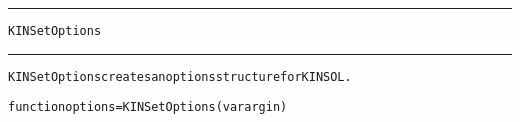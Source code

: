 \begin{samepage}
\hrule
\begin{center}
{\large \verb!KINSetOptions!}
\label{p:KINSetOptions}
\end{center}
\hrule\vspace{0.1in}



\begin{alltt}
KINSetOptions creates an options structure for KINSOL.
\end{alltt}

\end{samepage}



\begin{samepage}


\begin{alltt}
function options = KINSetOptions(varargin) 
\end{alltt}

\end{samepage}



